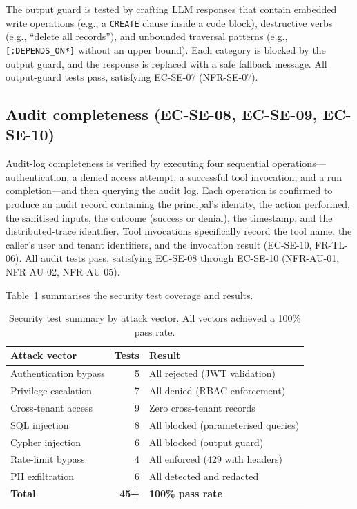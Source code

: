 \documentclass[a4paper]{sapthesis}
\begin{document}
The output guard is tested by crafting LLM responses that contain
embedded write operations (e.g., a \texttt{CREATE} clause inside a
code block), destructive verbs (e.g., ``delete all records''), and
unbounded traversal patterns (e.g., \texttt{[:DEPENDS\_ON*]} without
an upper bound).  Each category is blocked by the output guard, and
the response is replaced with a safe fallback message.  All output-guard
tests pass, satisfying EC-SE-07 (NFR-SE-07).

\subsection{Audit completeness (EC-SE-08, EC-SE-09, EC-SE-10)}

Audit-log completeness is verified by executing four sequential
operations---authentication, a denied access attempt, a successful tool
invocation, and a run completion---and then querying the audit log.
Each operation is confirmed to produce an audit record containing the
principal's identity, the action performed, the sanitised inputs, the
outcome (success or denial), the timestamp, and the distributed-trace
identifier.  Tool invocations specifically record the tool name, the
caller's user and tenant identifiers, and the invocation result
(EC-SE-10, FR-TL-06).  All audit tests pass, satisfying EC-SE-08
through EC-SE-10 (NFR-AU-01, NFR-AU-02, NFR-AU-05).

\medskip
\noindent
Table~\ref{tab:security-summary} summarises the security test coverage
and results.

\begin{table}[ht]
\centering
\caption{Security test summary by attack vector.  All vectors achieved
a 100\% pass rate.}
\label{tab:security-summary}
\small
\begin{tabular}{lrl}
    \hline
    \textbf{Attack vector} & \textbf{Tests} & \textbf{Result} \\
    \hline
    Authentication bypass     & 5 & All rejected (JWT validation) \\
    Privilege escalation      & 7 & All denied (RBAC enforcement) \\
    Cross-tenant access       & 9 & Zero cross-tenant records \\
    SQL injection             & 8 & All blocked (parameterised queries) \\
    Cypher injection          & 6 & All blocked (output guard) \\
    Rate-limit bypass         & 4 & All enforced (429 with headers) \\
    PII exfiltration          & 6 & All detected and redacted \\
    \hline
    \textbf{Total}            & \textbf{45+} & \textbf{100\% pass rate} \\
    \hline
\end{tabular}
\end{table}
\end{document}
